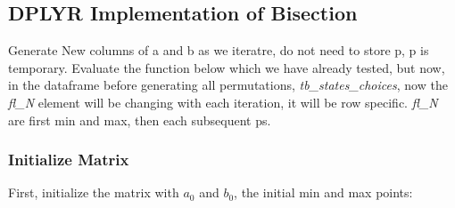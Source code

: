\documentclass[]{article}
\begin{document}
\hypertarget{dplyr-implementation-of-bisection}{%
\subsection{DPLYR Implementation of
Bisection}\label{dplyr-implementation-of-bisection}}

Generate New columns of a and b as we iteratre, do not need to store p,
p is temporary. Evaluate the function below which we have already
tested, but now, in the dataframe before generating all permutations,
\emph{tb\_states\_choices}, now the \emph{fl\_N} element will be
changing with each iteration, it will be row specific. \emph{fl\_N} are
first min and max, then each subsequent ps.

\hypertarget{initialize-matrix}{%
\subsubsection{Initialize Matrix}\label{initialize-matrix}}

First, initialize the matrix with \(a_0\) and \(b_0\), the initial min
and max points:
\end{document}

